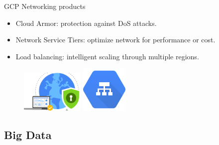 \documentclass{beamer}
\begin{document}
\begin{frame}[fragile]{GCP Networking products}
  \begin{itemize}[<+->]
    \item Cloud Armor: protection against DoS attacks.
    \item Network Service Tiers: optimize network for performance or cost.
    \item Load balancing: intelligent scaling through multiple regions.
  \end{itemize}

  \vspace{1cm}
  \begin{figure}[H]
    \includegraphics[width=0.27\textwidth]{../img/cloud_armor}
    \hspace{2cm}   \includegraphics[width=0.2\textwidth]{../img/load_balancing}
  \end{figure}
\end{frame}

\subsection{Big Data}
\end{document}
